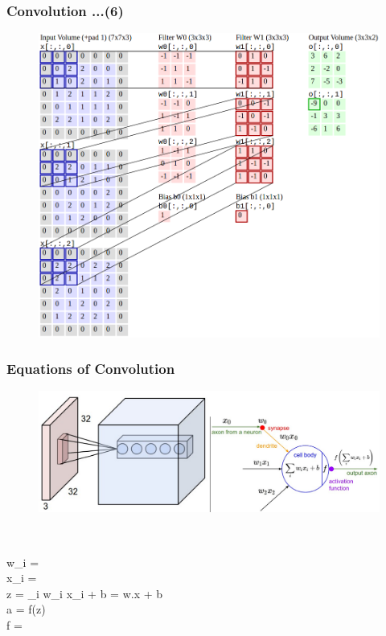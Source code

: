 \documentclass{beamer}
\newcommand*{\mathcolor}{}
\def\mathcolor#1#{\mathcoloraux{#1}}
\newcommand*{\mathcoloraux}[3]{%
  \protect\leavevmode
  \begingroup
    \color#1{#2}#3%
  \endgroup
}
\begin{document}
\begin{frame}
	\frametitle{Convolution ...(6)}
	\begin{figure}
		\includegraphics[scale=0.28]{./figures/edit/conv_08_edit.png}
	\end{figure}
\end{frame}

\begin{frame}
	\frametitle{Equations of Convolution}
	\begin{figure}
		\includegraphics[scale=0.28]{./figures/edit/conv_02.png}
	\end{figure} \\
	\begin{multiline}
		w_i =  \\
		x_i =  \\
		z = \sum_{i} w_i x_i + b = w.x + b  \\
		a = f(z) \\
		f =  \\
	\end{multiline}
\end{frame}
\end{document}
